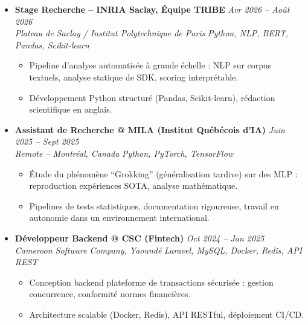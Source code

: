 \documentclass[a4paper,11pt]{article}
\begin{document}
\begin{itemize}[leftmargin=*, label={-}]
\item \textbf{Stage Recherche -- INRIA Saclay, Équipe TRIBE} \hfill \textit{Avr 2026 -- Août 2026} \\
\textit{Plateau de Saclay / Institut Polytechnique de Paris} \hfill \textit{Python, NLP, BERT, Pandas, Scikit-learn}
\vspace{-2pt}
    \begin{itemize}[leftmargin=0.4cm, nosep, label=\tiny$\bullet$]
        \item \small{Pipeline d'analyse automatisée à grande échelle : NLP sur corpus textuels, analyse statique de SDK, scoring interprétable.}
        \item \small{Développement Python structuré (Pandas, Scikit-learn), rédaction scientifique en anglais.}
    \end{itemize}
\vspace{3pt}

\item \textbf{Assistant de Recherche @ MILA (Institut Québécois d'IA)} \hfill \textit{Juin 2025 -- Sept 2025} \\
\textit{Remote -- Montréal, Canada} \hfill \textit{Python, PyTorch, TensorFlow}
\vspace{-2pt}
    \begin{itemize}[leftmargin=0.4cm, nosep, label=\tiny$\bullet$]
        \item \small{Étude du phénomène ``Grokking'' (généralisation tardive) sur des MLP : reproduction expériences SOTA, analyse mathématique.}
        \item \small{Pipelines de tests statistiques, documentation rigoureuse, travail en autonomie dans un environnement international.}
    \end{itemize}
\vspace{3pt}

\item \textbf{Développeur Backend @ CSC (Fintech)} \hfill \textit{Oct 2024 -- Jan 2025} \\
\textit{Cameroon Software Company, Yaoundé} \hfill \textit{Laravel, MySQL, Docker, Redis, API REST}
\vspace{-2pt}
    \begin{itemize}[leftmargin=0.4cm, nosep, label=\tiny$\bullet$]
        \item \small{Conception backend plateforme de transactions sécurisée : gestion concurrence, conformité normes financières.}
        \item \small{Architecture scalable (Docker, Redis), API RESTful, déploiement CI/CD.}
    \end{itemize}
\vspace{3pt}

\end{itemize}
\end{document}
